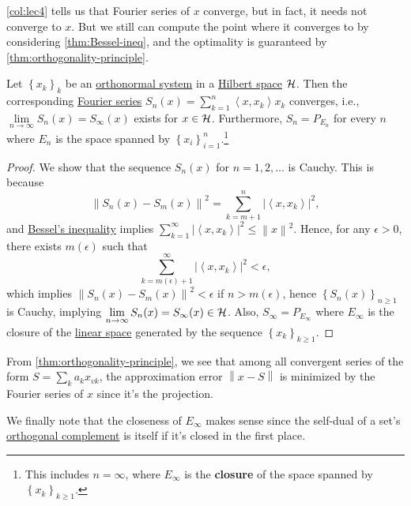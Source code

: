 \autoref{col:lec4} tells us that Fourier series of \(x\) converge, but in fact, it needs not converge to \(x\). But we still can compute the point where it converges to by considering \autoref{thm:Bessel-ineq}, and the optimality is guaranteed by \autoref{thm:orthogonality-principle}.

\begin{theorem}
	Let \(\left\{ x_{k}\right\}_{k} \) be an \hyperref[def:orthonormal-system]{orthonormal system} in a \hyperref[def:Hilbert-space]{Hilbert space} \(\mathcal{\MakeUppercase{h}} \). Then the corresponding \hyperref[def:Fourier-series]{Fourier series} \(S_n(x) = \sum_{k=1}^{n} \left\langle  x, x_{k} \right\rangle  x_{k}\) converges, i.e., \(\lim\limits_{n \to \infty} S_{n} (x) = S_{\infty }(x)\) exists for \(x\in \mathcal{\MakeUppercase{h}} \). Furthermore, \(S_n = P_{E_n}\) for every \(n\) where \(E_n\) is the space spanned by \(\left\{ x_i \right\} _{i=1}^n\).\footnote{This includes \(n=\infty\), where \(E_\infty \) is the \textbf{closure} of the space spanned by \(\left\{ x_k \right\}_{k\geq 1} \).}
\end{theorem}
\begin{proof}
	We show that the sequence \(S_n(x)\) for \(n = 1, 2, \ldots\) is Cauchy. This is because
	\[
		\left\lVert S_n(x) - S_m(x)\right\rVert ^{2} = \sum_{k=m+1}^{n} \left\vert \left\langle x, x_{k}\right\rangle  \right\vert ^{2},
	\]
	and \hyperref[thm:Bessel-ineq]{Bessel's inequality} implies \(\sum_{k=1}^{\infty} \left\vert \left\langle x, x_{k}  \right\rangle  \right\vert ^{2} \leq \left\lVert x\right\rVert ^{2} \). Hence, for any \(\epsilon > 0\), there exists \(m(\epsilon )\) such that
	\[
		\sum_{k=m(\epsilon )+1}^{\infty} \left\vert \left\langle x, x_{k}  \right\rangle  \right\vert ^{2} < \epsilon,
	\]
	which implies \(\left\lVert S_n(x) - S_m(x)\right\rVert ^{2} < \epsilon \) if \(n > m(\epsilon )\), hence \(\left\{ S_{n} (x) \right\}_{n\geq 1}\) is Cauchy, implying \(\lim\limits_{n \to \infty} S_n(x)= S_\infty (x)\in \mathcal{\MakeUppercase{h}} \). Also, \(S_\infty = P_{E_\infty }\) where \(E_\infty \) is the closure of the \hyperref[def:linear-vector-space]{linear space} generated by the sequence \(\left\{ x_{k} \right\}_{k \geq 1}\).
\end{proof}

\begin{remark}
	From \autoref{thm:orthogonality-principle}, we see that among all convergent series of the form \(S = \sum_{k} a_k x_{vk} \), the approximation error \(\left\lVert x - S\right\rVert \) is minimized by the Fourier series of \(x\) since it's the projection.
\end{remark}

We finally note that the closeness of \(E_\infty \) makes sense since the self-dual of a set's \hyperref[def:orthogonal-complement]{orthogonal complement} is itself if it's closed in the first place.